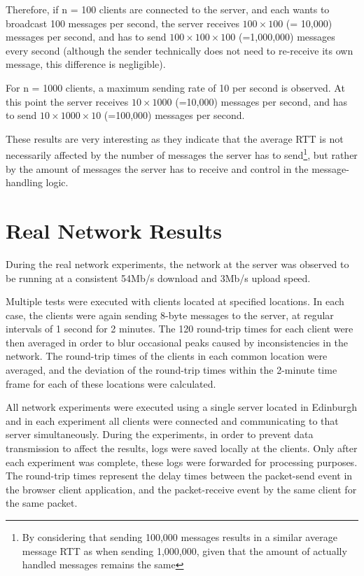 \documentclass[bsc, 12pt, twoside, singlespacing, parskip, abbrevs, notimes, normalheadings, logo, deptreport]{styles/infthesis}
\begin{document}
Therefore, if n = 100 clients are connected to the server, and each wants to broadcast 100 messages per second, the server receives $100 \times 100$ (= 10,000) messages per second, and has to send $100 \times 100 \times 100$ (=1,000,000) messages every second (although the sender technically does not need to re-receive its own message, this difference is negligible).

For n = 1000 clients, a maximum sending rate of 10 per second is observed. At this point the server receives $10 \times 1000$ (=10,000) messages per second, and has to send $10 \times 1000 \times 10$ (=100,000) messages per second.

These results are very interesting as they indicate that the average RTT is not necessarily affected by the number of messages the server has to send\footnote{By considering that sending 100,000 messages results in a similar average message RTT as when sending 1,000,000, given that the amount of actually handled messages remains the same}, but rather by the amount of messages the server has to receive and control in the message-handling logic.

\vspace{-1em}
\section{Real Network Results}
During the real network experiments, the network at the server was observed to be running at a consistent 54Mb/s download and 3Mb/s upload speed.

Multiple tests were executed with clients located at specified locations. In each case, the clients were again sending 8-byte messages to the server, at regular intervals of 1 second for 2 minutes. The 120 round-trip times for each client were then averaged in order to blur occasional peaks caused by inconsistencies in the network. The round-trip times of the clients in each common location were averaged, and the deviation of the round-trip times within the 2-minute time frame for each of these locations were calculated.

All network experiments were executed using a single server located in Edinburgh and in each experiment all clients were connected and communicating to that server simultaneously. During the experiments, in order to prevent data transmission to affect the results, logs were saved locally at the clients. Only after each experiment was complete, these logs were forwarded for processing purposes. The round-trip times represent the delay times between the packet-send event in the browser client application, and the packet-receive event by the same client for the same packet.
\end{document}
